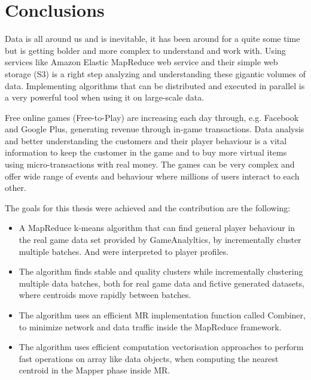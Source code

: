 
\chapter{Conclusions} %
\label{Chapter7}

Data is all around us and is inevitable, it has been around for a quite some time but is getting bolder and more complex to understand and work with. Using services like Amazon Elastic MapReduce web service and their simple web storage (S3) is a right step analyzing and understanding these gigantic volumes of data. Implementing algorithms that can be distributed and executed in parallel is a very powerful tool when using it on large-scale data. 

Free online games (Free-to-Play) are increasing each day through, e.g. Facebook and Google Plus, generating revenue through in-game transactions. Data analysis and better understanding the customers and their player behaviour is a vital information to keep the customer in the game and to buy more virtual items using micro-transactions with real money. The games can be very complex and offer wide range of events and behaviour where millions of users interact to each other.

The goals for this thesis were achieved and the contribution are the following:
\begin{itemize}
	\item A MapReduce k-means algorithm that can find general player behaviour in the real game data set provided by GameAnalyltics, by incrementally cluster multiple batches. And were interpreted to player profiles.
	\item The algorithm finds stable and quality clusters while incrementally clustering multiple data batches, both for real game data and fictive generated datasets, where centroids move rapidly between batches.
	\item The algorithm uses an efficient MR implementation function called Combiner, to minimize network and data traffic inside the MapReduce framework.
	\item The algorithm uses efficient computation vectorisation approaches to perform fast operations on array like data objects, when computing the nearest centroid in the Mapper phase inside MR.
\end{itemize}



